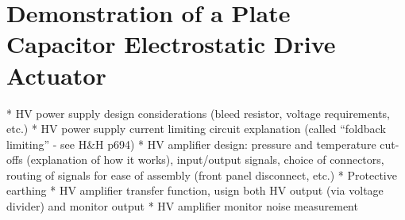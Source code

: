 \chapter{Demonstration of a Plate Capacitor Electrostatic Drive Actuator}
\label{c:esd-concept}

* HV power supply design considerations (bleed resistor, voltage requirements, etc.)
* HV power supply current limiting circuit explanation (called ``foldback limiting'' - see H&H p694)
* HV amplifier design: pressure and temperature cut-offs (explanation of how it works), input/output signals, choice of connectors, routing of signals for ease of assembly (front panel disconnect, etc.)
* Protective earthing
* HV amplifier transfer function, usign both HV output (via voltage divider) and monitor output
* HV amplifier monitor noise measurement